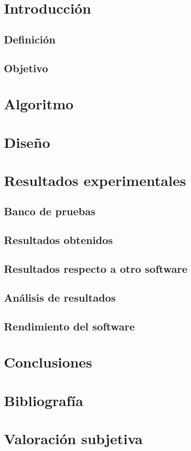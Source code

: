 \documentclass[11pt, titlepage,a4paper]{article}
\title{\textbf{\huge{Mineria de Datos} \\Laboratorio 6: Clustering
Jerarquico \newline
\begin{center}\texttt{[image: ./images/Portada.jpg]}\newline\footnote{Imagen extraida de
\url{http://jmj-qa.blogspot.com.es/2011/09/analisis-cluster.html}}\end{center}}
}
\author{Alberto Fernández \and Arkaitz Marcos \and Endika Serrano}
\date{}
\renewcommand{\thefootnote}{\fnsymbol{footnote}}
\begin{document}
\maketitle

\tableofcontents

\newpage
\renewcommand{\thefootnote}{\arabic{footnote}}
\section{Introducción}


\subsection{Definición}


\subsection{Objetivo}


\section{Algoritmo}

\section{Diseño}

\section{Resultados experimentales}

\subsection{Banco de pruebas}

\subsection{Resultados obtenidos}

\subsection{Resultados respecto a otro software}

\subsection{Análisis de resultados}

\subsection{Rendimiento del software}

\section{Conclusiones}

\section{Bibliografía}

\section{Valoración subjetiva}
\end{document}
